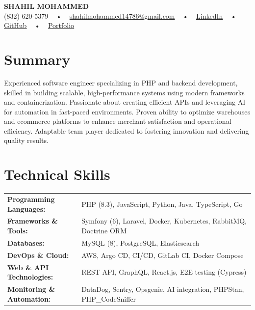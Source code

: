 \documentclass[letterpaper,11pt]{article}
\begin{document}
\begin{center}
    {\fontsize{14pt}{12pt}\selectfont \textbf{\MakeUppercase{Shahil Mohammed}}}\\ \vspace{2pt}
    \fontsize{10pt}{12pt}\selectfont (832) 620-5379 ~ • ~ \href{mailto:shahilmohammed14786@gmail.com}{shahilmohammed14786@gmail.com} ~ • ~  
    \href{https://www.linkedin.com/in/shahil-mohammed-9652931a1/}{\color{blue}\underline{LinkedIn}}  ~ • ~ 
    \href{https://github.com/freakbeast14}{\color{blue}\underline{GitHub}} ~ • ~ 
    \href{https://shahil-mohammed.netlify.app/}{\color{blue}\underline{Portfolio}}
    \vspace{-8pt}
\end{center}

\section{Summary}
\fontsize{9pt}{10pt}\selectfont
Experienced software engineer specializing in PHP and backend development, skilled in building scalable, high-performance systems using modern frameworks and containerization. Passionate about creating efficient APIs and leveraging AI for automation in fast-paced environments. Proven ability to optimize warehouses and ecommerce platforms to enhance merchant satisfaction and operational efficiency. Adaptable team player dedicated to fostering innovation and delivering quality results.

 \vspace{-5pt}
 
\section{Technical Skills}
        \vspace{-14pt}
        \begin{table}[h]
            \fontsize{9pt}{10pt}\selectfont
            \begin{tabular}{p{0.3\linewidth} p{0.7\linewidth}}
                \textbf{Programming Languages:} & PHP (8.3), JavaScript, Python, Java, TypeScript, Go \\
                \textbf{Frameworks \& Tools:} & Symfony (6), Laravel, Docker, Kubernetes, RabbitMQ, Doctrine ORM \\
                \textbf{Databases:} & MySQL (8), PostgreSQL, Elasticsearch \\
                \textbf{DevOps \& Cloud:} & AWS, Argo CD, CI/CD, GitLab CI, Docker Compose \\
                \textbf{Web \& API Technologies:} & REST API, GraphQL, React.js, E2E testing (Cypress) \\
                \textbf{Monitoring \& Automation:} & DataDog, Sentry, Opsgenie, AI integration, PHPStan, PHP_CodeSniffer \\
            \end{tabular}
        \end{table}
 \vspace{-15pt}
 
\end{document}
